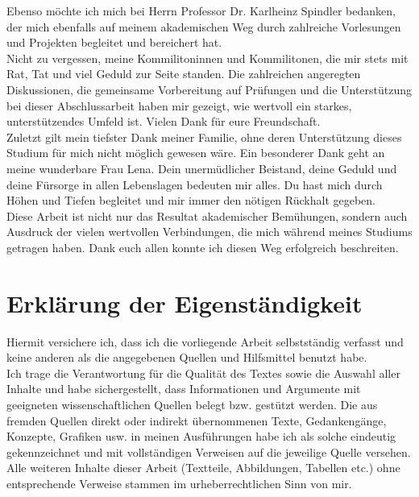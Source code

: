 \documentclass[a4paper,oneside, 11pt, openany%
]{article}
\theoremstyle{custom}
\theoremstyle{custom}
\begin{document}
	Ebenso möchte ich mich bei Herrn Professor Dr. Karlheinz Spindler bedanken, der mich ebenfalls auf meinem akademischen Weg durch zahlreiche Vorlesungen und Projekten begleitet und bereichert hat.\\
	
	Nicht zu vergessen, meine Kommilitoninnen und Kommilitonen, die mir stets mit Rat, Tat und viel Geduld zur Seite standen. Die zahlreichen angeregten Diskussionen, die gemeinsame Vorbereitung auf Prüfungen und die Unterstützung bei dieser Abschlussarbeit haben mir gezeigt, wie wertvoll ein starkes, unterstützendes Umfeld ist. Vielen Dank für eure Freundschaft.\\
	
	Zuletzt gilt mein tiefster Dank meiner Familie, ohne deren Unterstützung dieses Studium für mich nicht möglich gewesen wäre. Ein besonderer Dank geht an meine wunderbare Frau Lena. Dein unermüdlicher Beistand, deine Geduld und deine Fürsorge in allen Lebenslagen bedeuten mir alles. Du hast mich durch Höhen und Tiefen begleitet und mir immer den nötigen Rückhalt gegeben.\\
	
	Diese Arbeit ist nicht nur das Resultat akademischer Bemühungen, sondern auch Ausdruck der vielen wertvollen Verbindungen, die mich während meines Studiums getragen haben. Dank euch allen konnte ich diesen Weg erfolgreich beschreiten.
		\newpage
		\section*{Erklärung der Eigenständigkeit}
		Hiermit versichere ich, dass ich die vorliegende Arbeit selbstständig verfasst und keine anderen als die angegebenen Quellen und Hilfsmittel benutzt
		habe.\\
		
		Ich trage die Verantwortung für die Qualität des Textes sowie die Auswahl aller Inhalte und
		habe sichergestellt, dass Informationen und Argumente mit geeigneten wissenschaftlichen
		Quellen belegt bzw. gestützt werden. Die aus fremden Quellen direkt oder indirekt
		übernommenen Texte, Gedankengänge, Konzepte, Grafiken usw. in meinen Ausführungen
		habe ich als solche eindeutig gekennzeichnet und mit vollständigen Verweisen auf die
		jeweilige Quelle versehen. Alle weiteren Inhalte dieser Arbeit (Textteile, Abbildungen,
		Tabellen etc.) ohne entsprechende Verweise stammen im urheberrechtlichen Sinn von mir.\\
		
\end{document}
